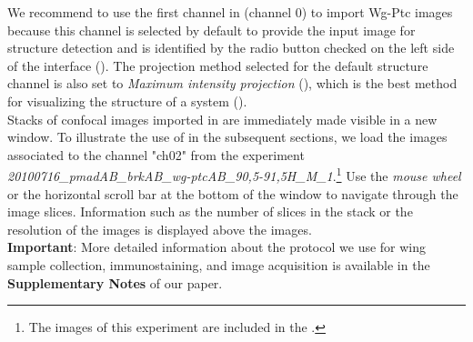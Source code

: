 We recommend to use the first channel in \wingj (channel 0) to import Wg-Ptc images because this channel is selected by default to provide the input image for structure detection and is identified by the radio button checked on the left side of the interface (). The projection method selected for the default structure channel is also set to \emph{Maximum intensity projection} (), which is the best method for visualizing the structure of a system ().\\

Stacks of confocal images imported in \wingj are immediately made visible in a new window. To illustrate the use of \wingj in the subsequent sections, we load the images associated to the channel "ch02" from the experiment \textit{20100716\_pmadAB\_brkAB\_wg-ptcAB\_90,5-91,5H\_M\_1}.\footnote{The images of this experiment are included in the \wingjBenchmarkImages.} Use the \emph{mouse wheel} or the horizontal scroll bar at the bottom of the window to navigate through the image slices. Information such as the number of slices in the stack or the resolution of the images is displayed above the images.\\



\textbf{Important}: More detailed information about the protocol we use for wing sample collection, immunostaining, and image acquisition is available in the \textbf{Supplementary Notes} of our paper\autocite{schaffter2013}.

